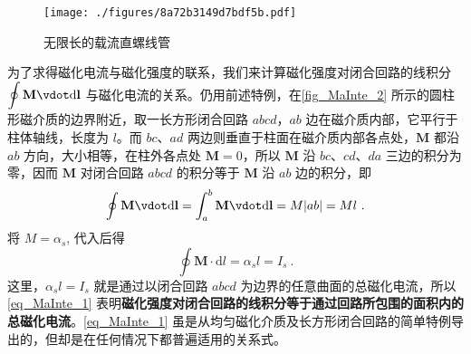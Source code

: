 \begin{figure}[ht]
\centering
\texttt{[image: ./figures/8a72b3149d7bdf5b.pdf]}
\caption{无限长的载流直螺线管} \label{fig_MaInte_2}
\end{figure}
为了求得磁化电流与磁化强度的联系，我们来计算磁化强度对闭合回路的线积分 $\displaystyle \oint \mathbf M \vdot \mathrm{d} \mathbf l$ 与磁化电流的关系。仍用前述特例，在\autoref{fig_MaInte_2} 所示的圆柱形磁介质的边界附近，取一长方形闭合回路 $abcd$，$ab $ 边在磁介质内部，它平行于柱体轴线，长度为 $l$。而 $bc$、$ad $ 两边则垂直于柱面在磁介质内部各点处，$\mathbf M$ 都沿 $ab $ 方向，大小相等，在柱外各点处 $\mathbf M=0$，所以 $\mathbf M $ 沿 $bc$、$cd$、$da $ 三边的积分为零，因而 $\mathbf M $ 对闭合回路 $abcd$ 的积分等于 $\mathbf M $ 沿 $ab $ 边的积分，即
\begin{equation}
\oint \mathbf{M}\vdot  \mathrm{d} \mathbf{l}=\int_{a}^{b} \mathbf{M} \vdot  \mathrm{d} \mathbf{l}=M|a b|=M l~.
\end{equation}
将 $M=\alpha_s$, 代入后得
\begin{equation} \label{eq_MaInte_1}
\oint \mathbf M \cdot \mathrm{d} l=\alpha_{s} l=I_{s}~.
\end{equation}
这里，$\alpha_sl=I_s$ 就是通过以闭合回路 $abcd$ 为边界的任意曲面的总磁化电流，所以\autoref{eq_MaInte_1} 表明\textbf{磁化强度对闭合回路的线积分等于通过回路所包围的面积内的总磁化电流}。\autoref{eq_MaInte_1} 虽是从均匀磁化介质及长方形闭合回路的简单特例导出的，但却是在任何情况下都普遍适用的关系式。
